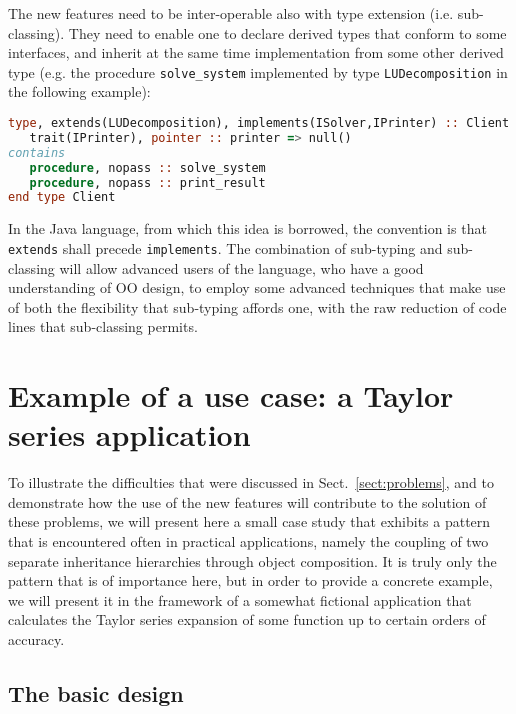 \documentclass[11pt,oneside]{article}
\begin{document}
The new features need to be inter-operable also with type extension
(i.e. sub-classing). They need to enable one to declare derived types
that conform to some interfaces, and inherit at the same time
implementation from some other derived type (e.g. the procedure
\texttt{solve\_system} implemented by type \texttt{LUDecomposition} in
the following example):
\begin{lstlisting}[language=Fortran]
type, extends(LUDecomposition), implements(ISolver,IPrinter) :: Client
   trait(IPrinter), pointer :: printer => null()
contains
   procedure, nopass :: solve_system
   procedure, nopass :: print_result
end type Client
\end{lstlisting}
In the Java language, from which this idea is borrowed, the convention
is that \texttt{extends} shall precede \texttt{implements}. The
combination of sub-typing and sub-classing will allow advanced users
of the language, who have a good understanding of OO design, to employ
some advanced techniques that make use of both the flexibility that
sub-typing affords one, with the raw reduction of code lines that
sub-classing permits.


\section{Example of a use case: a Taylor series application}

To illustrate the difficulties that were discussed in
Sect.~\ref{sect:problems}, and to demonstrate how the use of the new
features will contribute to the solution of these problems, we will
present here a small case study that exhibits a pattern that is
encountered often in practical applications, namely the coupling of
two separate inheritance hierarchies through object composition. It is
truly only the pattern that is of importance here, but in order to
provide a concrete example, we will present it in the framework of a
somewhat fictional application that calculates the Taylor series
expansion of some function up to certain orders of accuracy.

\subsection{The basic design}
\label{sect:basic_design}
\end{document}
